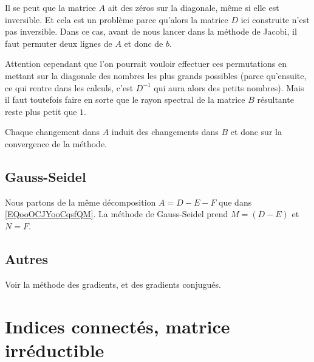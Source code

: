 \begin{remark}
	Il se peut que la matrice \( A\) ait des zéros sur la diagonale, même si elle est inversible. Et cela est un problème parce qu'alors la matrice \( D\) ici construite n'est pas inversible. Dans ce cas, avant de nous lancer dans la méthode de Jacobi, il faut permuter deux lignes de \( A\) et donc de \( b\).

	Attention cependant que l'on pourrait vouloir effectuer ces permutations en mettant sur la diagonale des nombres les plus grands possibles (parce qu'ensuite, ce qui rentre dans les calculs, c'est \( D^{-1}\) qui aura alors des petits nombres). Mais il faut toutefois faire en sorte que le rayon spectral de la matrice \(B \) résultante reste plus petit que \( 1\).

	Chaque changement dans \( A\) induit des changements dans \( B\) et donc sur la convergence de la méthode.
\end{remark}

\subsection{Gauss-Seidel}

Nous partons de la même décomposition \( A=D-E-F\) que dans \eqref{EQooOCJYooCqsfQM}. La méthode de Gauss-Seidel prend \( M=(D-E)\) et \( N=F\).

\subsection{Autres}

Voir la méthode des gradients, et des gradients conjugués.

\section{Indices connectés, matrice irréductible}

